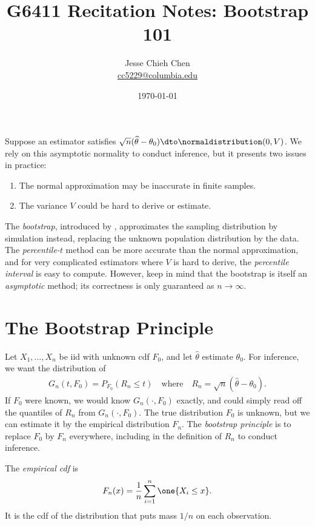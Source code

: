\documentclass[a4paper,12pt]{article}
\title{G6411 Recitation Notes: Bootstrap 101}
\author{Jesse Chieh Chen\\\href{mailto:cc5229@columbia.edu}{cc5229@columbia.edu}}
\date{\today}
\begin{document}
\maketitle

\begin{remark}
	Suppose an estimator satisfies $\sqrt n(\widehat\theta-\theta_0)\dto\normaldistribution(0,V)$.
	We rely on this asymptotic normality to conduct inference, but it presents two issues in practice:
	\begin{enumerate}
		\item The normal approximation may be inaccurate in finite samples.
		\item The variance $V$ could be hard to derive or estimate.
	\end{enumerate}
	The \emph{bootstrap}, introduced by \textcite{efron-1979}, approximates the sampling distribution by simulation instead,
	replacing the unknown population distribution by the data.
	The \emph{percentile-$t$} method can be more accurate than the normal approximation,
	and for very complicated estimators where $V$ is hard to derive, the \emph{percentile interval} is easy to compute.
	However, keep in mind that the bootstrap is itself an \emph{asymptotic} method;
	its correctness is only guaranteed as $n\to\infty$.
\end{remark}

\section{The Bootstrap Principle}

Let $X_1,...,X_n$ be \gls{iid} with unknown \gls{cdf} $F_0$, and let $\widehat\theta$ estimate $\theta_0$.
For inference, we want the distribution of
\begin{align}
	G_n(t,F_0)=P_{F_0}(R_n\le t)
	\quad\text{where}\quad
	R_n=\sqrt n(\widehat\theta-\theta_0).
\end{align}
If $F_0$ were known, we would know $G_n(\cdot,F_0)$ exactly, and could simply read off the quantiles of $R_n$ from $G_n(\cdot,F_0)$.
The true distribution $F_0$ is unknown, but we can estimate it by the empirical distribution $F_n$.
The \emph{bootstrap principle} is to replace $F_0$ by $F_n$ everywhere,
including in the definition of $R_n$ to conduct inference.

\begin{definition}
	The \emph{empirical \gls{cdf}} is
	\begin{align}
		F_n(x)=\frac1n\sum_{i=1}^n\one\{X_i\le x\}.
	\end{align}
	It is the \gls{cdf} of the distribution that puts mass $1/n$ on each observation.
\end{definition}
\end{document}
